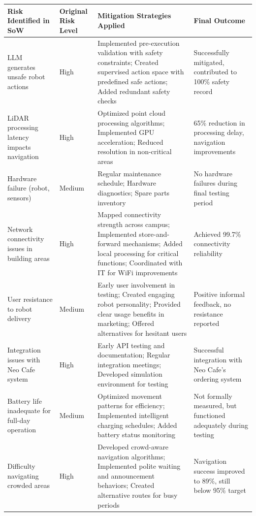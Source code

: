 \documentclass[12pt]{article}
\begin{document}
\renewcommand{\arraystretch}{1.2}
\begin{table}[h]
\centering
\begin{tabularx}{\textwidth}{|X|X|X|X|}
\hline
\textbf{Risk Identified in SoW} & \textbf{Original Risk Level} & \textbf{Mitigation Strategies Applied} & \textbf{Final Outcome} \\
\hline
LLM generates unsafe robot actions & High & Implemented pre-execution validation with safety constraints; Created supervised action space with predefined safe actions; Added redundant safety checks & Successfully mitigated, contributed to 100\% safety record \\
\hline
LiDAR processing latency impacts navigation & High & Optimized point cloud processing algorithms; Implemented GPU acceleration; Reduced resolution in non-critical areas & 65\% reduction in processing delay, navigation improvements \\
\hline
Hardware failure (robot, sensors) & Medium & Regular maintenance schedule; Hardware diagnostics; Spare parts inventory & No hardware failures during final testing period \\
\hline
Network connectivity issues in building areas & High & Mapped connectivity strength across campus; Implemented store-and-forward mechanisms; Added local processing for critical functions; Coordinated with IT for WiFi improvements & Achieved 99.7\% connectivity reliability \\
\hline
User resistance to robot delivery & Medium & Early user involvement in testing; Created engaging robot personality; Provided clear usage benefits in marketing; Offered alternatives for hesitant users & Positive informal feedback, no resistance reported \\
\hline
Integration issues with Neo Cafe system & High & Early API testing and documentation; Regular integration meetings; Developed simulation environment for testing & Successful integration with Neo Cafe's ordering system \\
\hline
Battery life inadequate for full-day operation & Medium & Optimized movement patterns for efficiency; Implemented intelligent charging schedules; Added battery status monitoring & Not formally measured, but functioned adequately during testing \\
\hline
Difficulty navigating crowded areas & High & Developed crowd-aware navigation algorithms; Implemented polite waiting and announcement behaviors; Created alternative routes for busy periods & Navigation success improved to 89\%, still below 95\% target \\

\end{tabularx}
\end{table}
\end{document}
